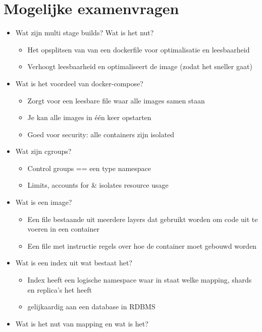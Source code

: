 \documentclass{article}
\begin{document}
\section{Mogelijke examenvragen}

\begin{itemize}
    \item Wat zijn multi stage builds? Wat is het nut? 
    \begin{itemize}
        \item Het opsplitsen van van een dockerfile voor optimalisatie en leesbaarheid
        \item Verhoogt leesbaarheid en optimaliseert de image (zodat het sneller gaat)
    \end{itemize}
    \item Wat is het voordeel van docker-compose? 
    \begin{itemize}
        \item Zorgt voor een leesbare file waar alle images samen staan
        \item Je kan alle images in één keer opstarten
        \item Goed voor security: alle containers zijn isolated
    \end{itemize}
    \item Wat zijn cgroups?
    \begin{itemize}
        \item Control groups == een type namespace
        \item Limits, accounts for \& isolates resource usage
    \end{itemize}
    \item Wat is een image?
    \begin{itemize}
        \item Een file bestaande uit meerdere layers dat gebruikt worden om code uit te voeren in een container
        \item Een file met instructie regels over hoe de container moet gebouwd worden
    \end{itemize}
    \item Wat is een index uit wat bestaat het?
    \begin{itemize}
        \item Index heeft een logische namespace waar in staat welke mapping, shards en replica's het heeft
        \item gelijkaardig aan een database in RDBMS
    \end{itemize}
    \item Wat is het nut van mapping en wat is het?

\end{itemize}
\end{document}
